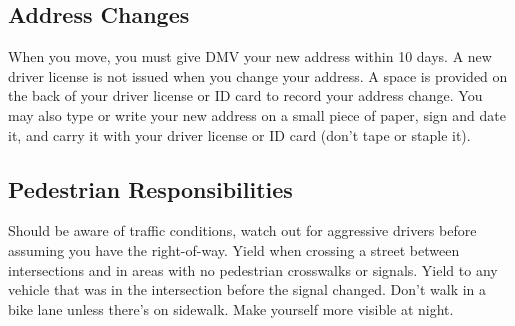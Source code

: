 \subsection{Address Changes}

When you move, you must give DMV your new address within 10 days.
A new driver license is not issued when you change your address.
A space is provided on the back of your driver license or ID card
to record your address change.
You may also type or write your new address on a small piece of paper,
sign and date it, and carry it with your driver license or ID card
(don't tape or staple it).

\subsection{Pedestrian Responsibilities}

Should be aware of traffic conditions,
watch out for aggressive drivers before assuming you have the right-of-way.
Yield when crossing a street between intersections
and in areas with no pedestrian crosswalks or signals.
Yield to any vehicle that was in the intersection before the signal changed.
Don't walk in a bike lane unless there's on sidewalk.
Make yourself more visible at night.
